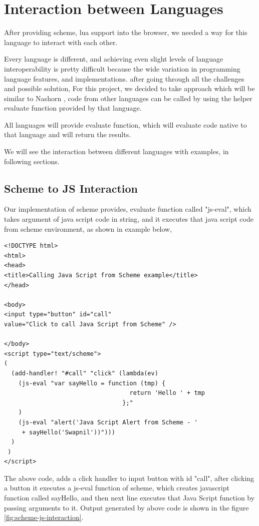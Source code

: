 \chapter{Interaction between Languages}

After providing scheme, lua support into the browser, we needed a way for this language to interact with each other. 

Every language is different, and achieving even slight levels of language interoperability is pretty difficult because the wide variation in programming language features, and implementations. after going through all the challenges and possible solution, For this project, we decided to take approach which will be similar to Nashorn \cite{Juneau2017}, code from other languages can be called by using the helper evaluate function provided by that language.

All languages will provide evaluate function, which will evaluate code native to that language and will return the results.

We will see the interaction between different languages with examples, in following sections.

\section{Scheme to JS Interaction}

Our implementation of scheme provides, evaluate function called "js-eval", which takes argument of java script code in string, and it executes that java script code from scheme environment, as shown in example below,

\begin{lstlisting}[frame=single]
<!DOCTYPE html>
<html>
<head>
<title>Calling Java Script from Scheme example</title>
</head>

<body>
<input type="button" id="call" 
value="Click to call Java Script from Scheme" />

</body>
<script type="text/scheme">
(
  (add-handler! "#call" "click" (lambda(ev)
    (js-eval "var sayHello = function (tmp) {
                                   return 'Hello ' + tmp
                                 };"
    )
    (js-eval "alert('Java Script Alert from Scheme - ' 
     + sayHello('Swapnil'))")))
  )
 )
</script>
\end{lstlisting}

The above code, adds a click handler to input button with id "call", after clicking a button it executes a js-eval function of scheme, which creates javascript function called sayHello, and then next line executes that Java Script function by passing arguments to it.  Output generated by above code is shown in the figure \ref{fig:scheme-js-interaction}.


